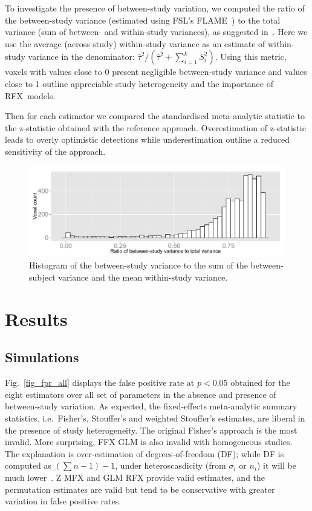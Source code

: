 \documentclass{llncs}
\newcommand{\vareffect}[1][i]{S^2_{#1}}
\newcommand{\nStudies}{k}
\newcommand{\estvarBetween}{\hat\tau^2}
\newcommand{\sampleSize}[1][i]{n_{#1}}
\begin{document}



To investigate the presence of between-study variation, we computed the ratio of the between-study variance (estimated using FSL's FLAME~\cite{Smith2001}) to the total variance (sum of between- and within-study variances), as suggested in~\cite{Chen2012}. Here we use the average (across study) within-study variance as an estimate of within-study variance in the denominator:
$\estvarBetween / (\estvarBetween + \sum_{i=1}^{\nStudies} \vareffect)$.
Using this metric, voxels with values close to 0 present negligible between-study variance and values close to 1 outline appreciable study heterogeneity and the importance of RFX~models.

Then for each estimator we compared the standardised meta-analytic statistic to the z-statistic obtained with the reference approach. Overestimation of z-statistic leads to overly optimistic detections while underestimation outline a reduced sensitivity of the approach. 

\begin{figure}[t]
	\centering
	\includegraphics[width=0.7\linewidth]{./Rplot_ratio_variances.pdf}
	\caption{Histogram of the between-study variance to the sum of the between-subject variance and the mean within-study variance.}
	\label{fig_realdata_variances}
\end{figure}

\section{Results}\label{sec_res}

\subsection{Simulations}
Fig.~\ref{fig_fpr_all} displays the false positive rate at $p<0.05$ obtained for the eight estimators over all set of parameters in the absence and presence of between-study variation. As expected, the fixed-effects meta-analytic summary statistics, i.e.\ Fisher's, Stouffer's and weighted Stouffer's estimates, are liberal in the presence of study heterogeneity. The original Fisher's approach is the most invalid. More surprising, FFX GLM is also invalid with homogeneous studies. The explanation is over-estimation of degrees-of-freedom (DF); while DF is computed as $(\sum n-1)-1$, under heteroscasdicity (from $\sigma_i$ or $\sampleSize$) it will be much lower~\cite{Satterthwaite}. Z MFX and GLM RFX provide valid estimates, and the permutation estimates are valid but tend to be conservative with greater variation in false positive rates.
\end{document}
